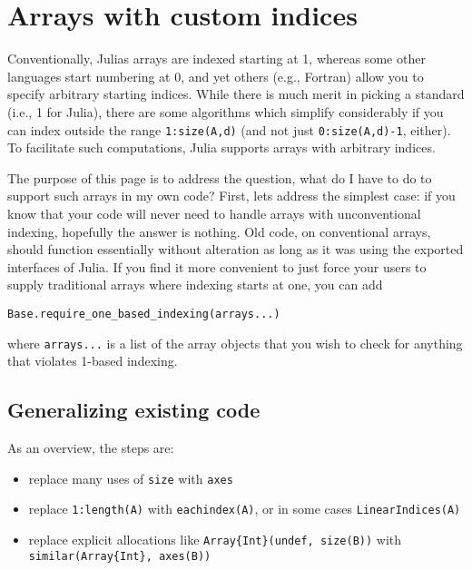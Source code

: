 \hypertarget{10976543622473505620}{}


\section{Arrays with custom indices}



Conventionally, Julia{\textquotesingle}s arrays are indexed starting at 1, whereas some other languages start numbering at 0, and yet others (e.g., Fortran) allow you to specify arbitrary starting indices.  While there is much merit in picking a standard (i.e., 1 for Julia), there are some algorithms which simplify considerably if you can index outside the range \texttt{1:size(A,d)} (and not just \texttt{0:size(A,d)-1}, either). To facilitate such computations, Julia supports arrays with arbitrary indices.



The purpose of this page is to address the question, {\textquotedbl}what do I have to do to support such arrays in my own code?{\textquotedbl}  First, let{\textquotesingle}s address the simplest case: if you know that your code will never need to handle arrays with unconventional indexing, hopefully the answer is {\textquotedbl}nothing.{\textquotedbl} Old code, on conventional arrays, should function essentially without alteration as long as it was using the exported interfaces of Julia. If you find it more convenient to just force your users to supply traditional arrays where indexing starts at one, you can add




\begin{verbatim}
Base.require_one_based_indexing(arrays...)
\end{verbatim}



where \texttt{arrays...} is a list of the array objects that you wish to check for anything that violates 1-based indexing.



\hypertarget{12133789893433293548}{}


\subsection{Generalizing existing code}



As an overview, the steps are:



\begin{itemize}
\item replace many uses of \texttt{size} with \texttt{axes}


\item replace \texttt{1:length(A)} with \texttt{eachindex(A)}, or in some cases \texttt{LinearIndices(A)}


\item replace explicit allocations like \texttt{Array\{Int\}(undef, size(B))} with \texttt{similar(Array\{Int\}, axes(B))}

\end{itemize}


